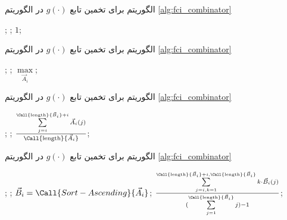 \begin{algorithm}[t]
\caption{الگوریتم  برای تخمین تابع $g(\cdot)$ در الگوریتم \ref{alg:fci_combinator}}\label{alg:g:const-one}
\begin{latin}
\begin{algorithmic}[1]
		\State {};
		\State {};
	\Else
		\State \Return $1$;
	\EndIf
\EndProcedure
\end{algorithmic}
\end{latin}
\end{algorithm}

\begin{algorithm}[t]
\caption{الگوریتم  برای تخمین تابع $g(\cdot)$ در الگوریتم \ref{alg:fci_combinator}}\label{alg:g:max}
\begin{latin}
\begin{algorithmic}[1]
		\State {};
		\State {};
	\Else
		\State \Return $\max\limits_{\vec{A}_i}$;
	\EndIf
\EndProcedure
\end{algorithmic}
\end{latin}
\end{algorithm}

\begin{algorithm}[t]
\caption{الگوریتم  برای تخمین تابع $g(\cdot)$ در الگوریتم \ref{alg:fci_combinator}}\label{alg:g:mean}
\begin{latin}
\begin{algorithmic}[1]
		\State {};
		\State {};
	\Else
		\State \Return ${\sum\limits_{j=i}^{\Call{\text{length}}{\vec{B}_i} + i} \vec{A}_i(j) \over \Call{\text{length}}{\vec{A}_i}}$;
	\EndIf
\EndProcedure
\end{algorithmic}
\end{latin}
\end{algorithm}

\begin{algorithm}[t]
\caption{الگوریتم  برای تخمین تابع $g(\cdot)$ در الگوریتم \ref{alg:fci_combinator}}\label{alg:g:k-mean}
\begin{latin}
\begin{algorithmic}[1]
		\State {};
		\State {};
	\Else
		\State $\vec{B}_i = \Call{Sort-Ascending}{\vec{A}_i}$;
		\State \Return ${\sum\limits_{j=i, k = 1}^{\Call{\text{length}}{\vec{B}_i} + i, \Call{\text{length}}{\vec{B}_i}}  k \cdot \vec{B}_i(j) \over {(\sum\limits_{j=1}^{\Call{\text{length}}{\vec{B}_i}} j) - 1}}$;
	\EndIf
\EndProcedure
\end{algorithmic}
\end{latin}
\end{algorithm}

